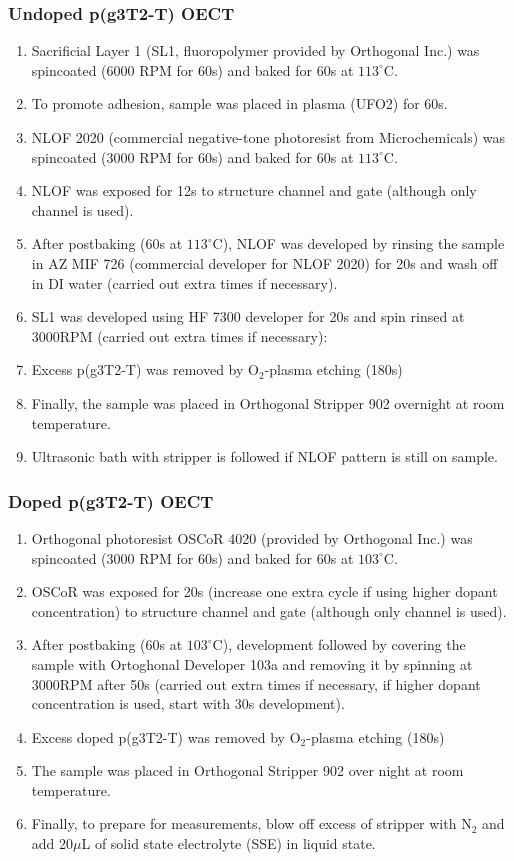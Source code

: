 \subsubsection{Undoped p(g3T2-T) OECT}
\begin{enumerate}
\item Sacrificial Layer 1 (SL1, fluoropolymer provided by Orthogonal Inc.) was spincoated (6000 RPM for 60s) and baked for 60s at $113^{\circ}$C.
\item To promote adhesion, sample was placed in plasma (UFO2) for 60s. 
\item NLOF 2020 (commercial negative-tone photoresist from Microchemicals) was spincoated (3000 RPM for 60s) and baked for 60s at $113^{\circ}$C.
\item NLOF was exposed for 12s to structure channel and gate (although only channel is used).
\item After postbaking (60s at $113^{\circ}$C), NLOF was developed by rinsing the sample in AZ MIF 726 (commercial developer for NLOF 2020) for 20s and wash off in DI water (carried out extra times if necessary).
\item SL1 was developed using HF 7300 developer for 20s and spin rinsed at 3000RPM (carried out extra times if necessary):
\item Excess p(g3T2-T) was removed by O$_{2}$-plasma etching (180s)
\item Finally, the sample was placed in Orthogonal Stripper 902 overnight at room temperature.
\item Ultrasonic bath with stripper is followed if NLOF pattern is still on sample.
\end{enumerate}


\subsubsection{Doped p(g3T2-T) OECT}
\begin{enumerate}
\item Orthogonal photoresist OSCoR 4020 (provided by Orthogonal Inc.) was spincoated (3000 RPM for 60s) and baked for 60s at $103^{\circ}$C.
\item OSCoR was exposed for 20s (increase one extra cycle if using higher dopant concentration) to structure channel and gate (although only channel is used).
\item After postbaking (60s at $103^{\circ}$C), development followed by covering the sample with Ortoghonal Developer 103a and removing it by spinning at 3000RPM after 50s (carried out extra times if necessary, if higher dopant concentration is used, start with 30s development).
\item Excess doped p(g3T2-T) was removed by O$_{2}$-plasma etching (180s)
\item The sample was placed in Orthogonal Stripper 902 over night at room temperature.
\item Finally, to prepare for measurements, blow off excess of stripper with N$_{2}$ and add 20$\mu$L of solid state electrolyte (SSE) in liquid state.
\end{enumerate}

